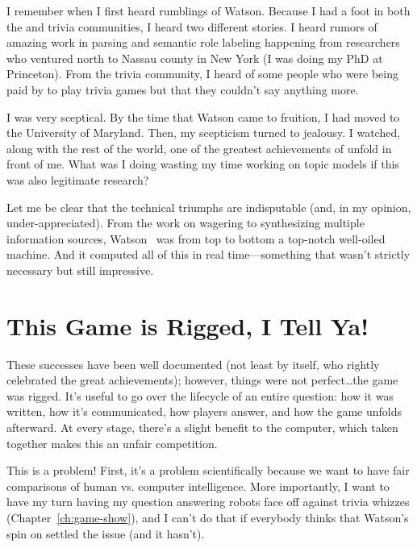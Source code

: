

I remember when I first heard rumblings of Watson.
%
Because I had a foot in both the  and trivia communities, I
heard two different stories.
%
I heard rumors of amazing work in parsing and semantic role labeling
happening from researchers who ventured north to Nassau county in New
York (I was doing my PhD at Princeton).
%
From the trivia community, I heard of some people who were being paid
by  to play trivia games but that they couldn't say anything
more.

I was very sceptical.
%
By the time that Watson came to fruition, I had moved to the
University of Maryland.
%
Then, my scepticism turned to jealousy.
%
I watched, along with the rest of the world, one of the greatest
achievements of  unfold in front of me.
%
What was I doing wasting my time working on topic models if this was
also legitimate research?

Let me be clear that the technical triumphs are indisputable (and, in
my opinion, under-appreciated).
%
From the work on wagering to synthesizing multiple information
sources, Watson~\citep{ferruci-10} was from top to bottom a top-notch well-oiled machine.
%
And it computed all of this in real time---something that wasn't
strictly necessary but still impressive.

\section{This Game is Rigged, I Tell Ya!}

These successes have been well documented (not least by 
itself, who rightly celebrated the great achievements); however,
things were not perfect\dots the game was rigged.
%
It's useful to go over the lifecycle of an entire question: how it was
written, how it's communicated, how players answer, and how the game
unfolds afterward.
%
At every stage, there's a slight benefit to the computer, which taken
together makes this an unfair competition.

This is a problem!  First, it's a problem scientifically because we
want to have fair comparisons of human vs. computer intelligence.
%
More importantly, I want to have my turn having my question answering
robots face off against trivia whizzes (Chapter~\ref{ch:game-show}),
and I can't do that if everybody thinks that Watson's spin
on \jeopardy{} settled the issue (and it hasn't).


